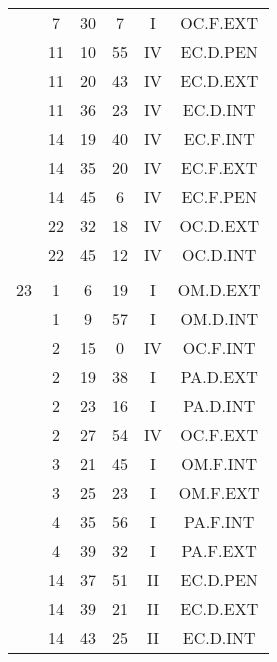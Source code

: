 \documentclass[12pt, a4paper]{article}
\begin{document}
\begin{multicols}{3}
{\begin{tabular}{c c c c c c}
	 	 	 	 & 7 & 30 & 7 & I & OC.F.EXT\\%
	 	 	 	 & 11 & 10 & 55 & IV & EC.D.PEN\\%
	 	 	 	 & 11 & 20 & 43 & IV & EC.D.EXT\\%
	 	 	 	 & 11 & 36 & 23 & IV & EC.D.INT\\%
	 	 	 	 & 14 & 19 & 40 & IV & EC.F.INT\\%
	 	 	 	 & 14 & 35 & 20 & IV & EC.F.EXT\\%
	 	 	 	 & 14 & 45 & 6 & IV & EC.F.PEN\\%
	 	 	 	 & 22 & 32 & 18 & IV & OC.D.EXT\\%
	 	 	 	 & 22 & 45 & 12 & IV & OC.D.INT\\%
	 	 	 	 & & & & & \\%
	 	 	 	23 & 1 & 6 & 19 & I & OM.D.EXT\\%
	 	 	 	 & 1 & 9 & 57 & I & OM.D.INT\\%
	 	 	 	 & 2 & 15 & 0 & IV & OC.F.INT\\%
	 	 	 	 & 2 & 19 & 38 & I & PA.D.EXT\\%
	 	 	 	 & 2 & 23 & 16 & I & PA.D.INT\\%
	 	 	 	 & 2 & 27 & 54 & IV & OC.F.EXT\\%
	 	 	 	 & 3 & 21 & 45 & I & OM.F.INT\\%
	 	 	 	 & 3 & 25 & 23 & I & OM.F.EXT\\%
	 	 	 	 & 4 & 35 & 56 & I & PA.F.INT\\%
	 	 	 	 & 4 & 39 & 32 & I & PA.F.EXT\\%
	 	 	 	 & 14 & 37 & 51 & II & EC.D.PEN\\%
	 	 	 	 & 14 & 39 & 21 & II & EC.D.EXT\\%
	 	 	 	 & 14 & 43 & 25 & II & EC.D.INT\\%
	 	 \end{tabular}
 	}
\end{multicols}
\end{document}

